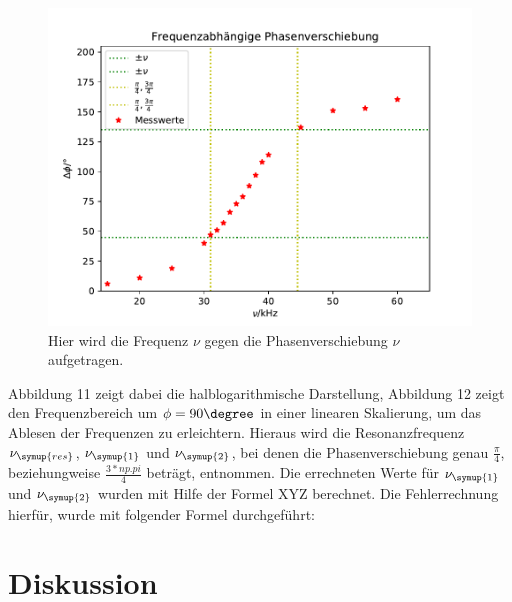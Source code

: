 \begin{figure}
  \centering
  \includegraphics[scale = 0.7]{plotD2.pdf}
  \caption{Hier wird die Frequenz $\nu$ gegen die Phasenverschiebung $\nu$ aufgetragen.}
  \label{Abb:12}
 \end{figure}


Abbildung 11 zeigt dabei die halblogarithmische Darstellung, Abbildung 12 zeigt den Frequenzbereich um $\phi = 90 \degree$
in einer linearen Skalierung, um das Ablesen der Frequenzen zu erleichtern. Hieraus wird die Resonanzfrequenz $\nu_\symup{res}$,
$\nu_\symup{1}$ und $\nu_\symup{2}$, bei denen die Phasenverschiebung genau $\frac{\pi}{4}$, beziehungweise $\frac{3*np.pi}{4}$
beträgt, entnommen.
Die errechneten Werte für $\nu_\symup{1}$ und $\nu_\symup{2}$ wurden mit Hilfe der Formel XYZ berechnet.
Die Fehlerrechnung hierfür, wurde mit folgender Formel durchgeführt:

\section{Diskussion}

